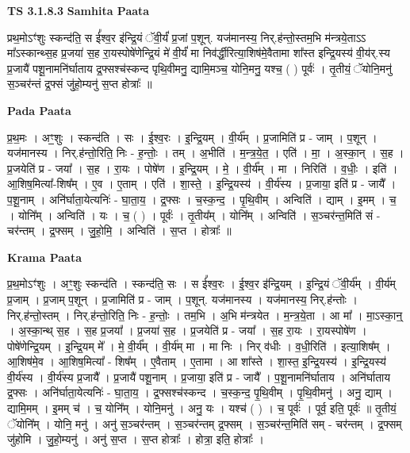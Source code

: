 \documentclass[17pt]{extarticle}
\begin{document}
\textbf{TS 3.1.8.3 } \newline
\textbf{Samhita Paata} \newline

प्रथ॒मोऽꣳ॑शुः स्कन्द॑ति॒ स ई᳚श्व॒र इ॑न्द्रि॒यं ॅवी॒र्यं॑ प्र॒जां प॒शून्. यज॑मानस्य॒ निर्.ह॑न्तो॒स्तम॒भि म॑न्त्रये॒ताऽऽ मा᳚ऽस्कान्थ्स॒ह प्र॒जया॑ स॒ह रा॒यस्पोषे॑णेन्द्रि॒यं मे॑ वी॒र्यं॑ मा निव॑र्द्धी॒रित्या॒शिष॑मे॒वैतामा शा᳚स्त इन्द्रि॒यस्य॑ वी॒य॑र्.स्य प्र॒जायै॑ पशू॒नामनि॑र्घाताय द्र॒फ्सश्च॑स्कन्द पृथि॒वीमनु॒ द्यामि॒मञ्च॒ योनि॒मनु॒ यश्च॒ ( ) पूर्वः॑ । तृ॒तीयं॒ ॅयोनि॒मनु॑ स॒ञ्चर॑न्तं द्र॒फ्सं जु॑हो॒म्यनु॑ स॒प्त होत्राः᳚ ॥ \newline

\textbf{Pada Paata} \newline

प्र॒थ॒मः । अꣳ॒॒शुः । स्कन्द॑ति । सः । ई॒श्व॒रः । इ॒न्द्रि॒यम् । वी॒र्य᳚म् । प्र॒जामिति॑ प्र - जाम् । प॒शून् । यज॑मानस्य । निर्.ह॑न्तो॒रिति॒ निः - ह॒न्तोः॒ । तम् । अ॒भीति॑ । म॒न्त्र॒ये॒त॒ । एति॑ । मा॒ । अ॒स्का॒न् । स॒ह । प्र॒जयेति॑ प्र - जया᳚ । स॒ह । रा॒यः । पोषे॑ण । इ॒न्द्रि॒यम् । मे॒ । वी॒र्य᳚म् । मा । निरिति॑ । व॒धीः॒ । इति॑ । आ॒शिष॒मित्या᳚-शिष᳚म् । ए॒व । ए॒ताम् । एति॑ । शा॒स्ते॒ । इ॒न्द्रि॒यस्य॑ । वी॒र्य॑स्य । प्र॒जाया॒ इति॑ प्र - जायै᳚ । प॒शू॒नाम् । अनि॑र्घाता॒येत्यनिः॑ - घा॒ता॒य॒ । द्र॒फ्सः । च॒स्क॒न्द॒ । पृ॒थि॒वीम् । अन्विति॑ । द्याम् । इ॒मम् । च॒ । योनि᳚म् । अन्विति॑ । यः । च॒ ( ) । पूर्वः॑ । तृ॒तीय᳚म् । योनि᳚म् । अन्विति॑ । स॒ञ्चर॑न्त॒मिति॑ सं - चर॑न्तम् । द्र॒फ्सम् । जु॒हो॒मि॒ । अन्विति॑ । स॒प्त । होत्राः᳚ ॥  \newline


\textbf{Krama Paata} \newline

प्र॒थ॒मोऽꣳ॑शुः । अꣳ॒॒शुः स्कन्द॑ति । स्कन्द॑ति॒ सः । स ई᳚श्व॒रः । ई॒श्व॒र इ॑न्द्रि॒यम् । इ॒न्द्रि॒यं ॅवी॒र्य᳚म् । वी॒र्य॑म् प्र॒जाम् । प्र॒जाम् प॒शून् । प्र॒जामिति॑ प्र - जाम् । प॒शून्. यज॑मानस्य । यज॑मानस्य॒ निर्.ह॑न्तोः । निर्.ह॑न्तो॒स्तम् । निर्.ह॑न्तो॒रिति॒ निः - ह॒न्तोः॒ । तम॒भि । अ॒भि म॑न्त्रयेत । म॒न्त्र॒ये॒ता । आ मा᳚ । मा॒ऽस्का॒न्॒ । अ॒स्का॒न्थ् स॒ह । स॒ह प्र॒जया᳚ । प्र॒जया॑ स॒ह । प्र॒जयेति॑ प्र - जया᳚ । स॒ह रा॒यः । रा॒यस्पोषे॑ण । पोषे॑णेन्द्रि॒यम् । इ॒न्द्रि॒यम् मे᳚ । मे॒ वी॒र्य᳚म् । वी॒र्य॑म् मा । मा निः । निर् व॑धीः । व॒धी॒रिति॑ । इत्या॒शिष᳚म् । आ॒शिष॑मे॒व । आ॒शिष॒मित्या᳚ - शिष᳚म् । ए॒वैताम् । ए॒तामा । आ शा᳚स्ते । शा॒स्त॒ इ॒न्द्रि॒यस्य॑ । इ॒न्द्रि॒यस्य॑ वी॒र्य॑स्य । वी॒र्य॑स्य प्र॒जायै᳚ । प्र॒जायै॑ पशू॒नाम् । प्र॒जाया॒ इति॑ प्र - जायै᳚ । प॒शू॒नामनि॑र्घाताय । अनि॑र्घाताय द्र॒फ्सः । अनि॑र्घाता॒येत्यनिः॑ - घा॒ता॒य॒ । द्र॒फ्सश्च॑स्कन्द । च॒स्क॒न्द॒ पृ॒थि॒वीम् । पृ॒थि॒वीमनु॑ । अनु॒ द्याम् । द्यामि॒मम् । इ॒मम् च॑ । च॒ योनि᳚म् । योनि॒मनु॑ । अनु॒ यः । यश्च॑ ( ) । च॒ पूर्वः॑ । पूर्व॒ इति॒ पूर्वः॑ ॥ तृ॒तीयं॒ ॅयोनि᳚म् । योनि॒ मनु॑ । अनु॑ स॒ञ्चर॑न्तम् । स॒ञ्चर॑न्तम् द्र॒फ्सम् । स॒ञ्चर॑न्त॒मिति॑ सम् - चर॑न्तम् । द्र॒फ्सम् जु॑होमि । जु॒हो॒म्यनु॑ । अनु॑ स॒प्त । स॒प्त होत्राः᳚ । होत्रा॒ इति॒ होत्राः᳚ । \newline
\end{document}
